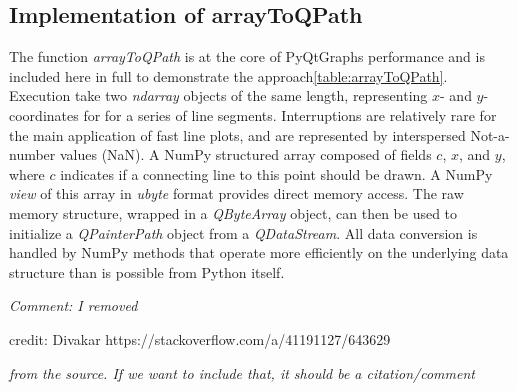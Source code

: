 \documentclass[journal]{vgtc}                %
\begin{document}
\subsection{Implementation of arrayToQPath}
\label{app_arrayToQPath}
The function \emph{arrayToQPath} is at the core of PyQtGraphs performance and is included here in full to demonstrate the approach\ref{table:arrayToQPath}. 
Execution take two \emph{ndarray} objects of the same length, representing $x$- and $y$-coordinates for for a series of line segments. Interruptions are relatively rare for the main application of fast line plots, and are represented by interspersed Not-a-number values (NaN). A NumPy structured array composed of fields $c$, $x$, and $y$, where $c$ indicates if a connecting line to this point should be drawn. A NumPy \emph{view} of this array in \emph{ubyte} format provides direct memory access. The raw memory structure, wrapped in a \emph{QByteArray} object, can then be used to initialize a \emph{QPainterPath} object from a \emph{QDataStream}. All data conversion is handled by NumPy methods that operate more efficiently on the underlying data structure than is possible from Python itself.

\emph{Comment: I removed}

credit: Divakar https://stackoverflow.com/a/41191127/643629

\emph{from the source. If we want to include that, it should be a citation/comment}
\end{document}
